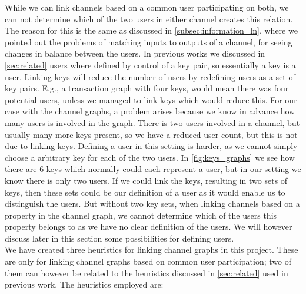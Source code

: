 While we can link channels based on a common user participating on both, we can not determine which of the two users in either channel creates this relation. 
The reason for this is the same as discussed in \cref{subsec:information_ln}, where we pointed out the problems of matching inputs to outputs of a channel, for seeing changes in balance between the users. 
In previous works we discussed in \cref{sec:related} users where defined by control of a key pair, so essentially a key is a user.
Linking keys will reduce the number of users by redefining users as a set of key pairs.
E.g., a transaction graph with four keys, would mean there was four potential users, unless we managed to link keys which would reduce this.
For our case with the channel graphs, a problem arises because we know in advance how many users is involved in the graph.
There is two users involved in a channel, but usually many more keys present, so we have a reduced user count, but this is not due to linking keys. Defining a user in this setting is harder, as we cannot simply choose a arbitrary key for each of the two users. In \cref{fig:keys_graphs} we see how there are 6 keys which normally could each represent a user, but in our setting we know there is only two users. If we could link the keys, resulting in two sets of keys, then these sets could be our definition of a user as it would enable us to distinguish the users. But without two key sets, when linking channels based on a property in the channel graph, we cannot determine which of the users this property belongs to as we have no clear definition of the users.
We will however discuss later in this section some possibilities for defining users.
\\

We have created three heuristics for linking channel graphs in this project.
These are only for linking channel graphs based on common user participation; two of them can however be related to the heuristics discussed in \cref{sec:related} used in previous work. The heuristics employed are:

